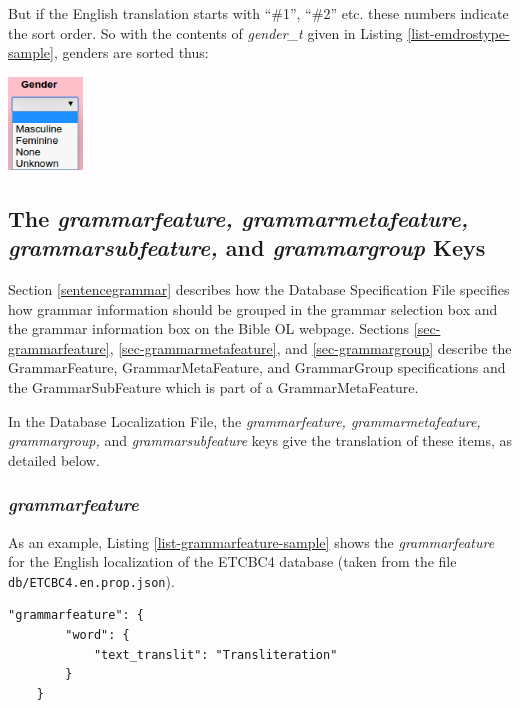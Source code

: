 \documentclass[11pt,oneside,a4paper]{memoir}
\begin{document}
But if the English translation starts with ``\#1'', ``\#2'' etc. these numbers indicate the sort
order. So with the contents of \emph{gender\_t} given in Listing \ref{list-emdrostype-sample},
genders are sorted thus:

\begin{center}
  \includegraphics[width=0.148\textwidth]{gender.png}
\end{center}


\subsection{The \emph{grammarfeature, grammarmetafeature, grammarsubfeature,} and
  \emph{grammargroup} Keys}\label{grammar-loc}

Section \ref{sentencegrammar} describes how the Database Specification File specifies how grammar
information should be grouped in the grammar selection box and the grammar information box on the
Bible OL webpage. Sections \ref{sec-grammarfeature}, \ref{sec-grammarmetafeature}, and \ref{sec-grammargroup} describe the GrammarFeature,
GrammarMetaFeature, and GrammarGroup specifications and the GrammarSubFeature which is part of a
GrammarMetaFeature.

In the Database Localization File, the \emph{grammarfeature, grammarmetafeature, grammargroup,} and
\emph{grammarsubfeature} keys give the translation of these items, as detailed below.

\subsubsection{\emph{grammarfeature}}

As an example, Listing \ref{list-grammarfeature-sample} shows the \emph{grammarfeature} for the
English localization of the ETCBC4 database (taken from the file \texttt{db/ETCBC4.en.prop.json}).

\begin{lstlisting}[caption=A sample grammarfeature value,label=list-grammarfeature-sample]
    "grammarfeature": {
        "word": {
            "text_translit": "Transliteration"
        }
    }
\end{lstlisting}
\end{document}
